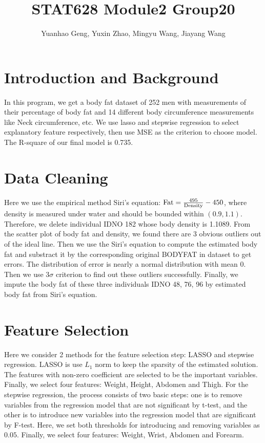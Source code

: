 \documentclass[12pt]{article}
\title{\vspace{-1.0cm}STAT628 Module2 Group20}
\author{Yuanhao Geng, Yuxin Zhao, Mingyu Wang, Jiayang Wang}
\date{}
\begin{document}
\maketitle
\vspace{-1.5cm}
\section{\vspace{-0.3cm}Introduction and Background}
In this program, we get a body fat dataset of 252 men with measurements of their percentage of body fat and 14 different body circumference measurements like Neck circumference, etc. We use lasso and stepwise regression to select explanatory feature respectively, then use MSE as the criterion to choose model. The R-square of our final model is 0.735.
\vspace{-0.6cm}
\section{\vspace{-0.3cm}Data Cleaning}

Here we use the empirical method Siri's equation: $\rm Fat=\frac{495}{Density} - 450$, where density is measured under water and should be bounded within $(0.9,1.1)$. Therefore, we delete individual IDNO 182 whose body density is 1.1089. From the scatter plot of body fat and density, we found there are 3 obvious outliers out of the ideal line. Then we use the Siri's equation to compute the estimated body fat and substract it by the corresponding original BODYFAT in dataset to get errors. The distribution of error is nearly a normal distribution with mean 0. Then we use $3\sigma$ criterion to find out these outliers successfully. Finally, we impute the body fat of these three individuals IDNO 48, 76, 96 by estimated body fat from Siri's equation.
\vspace{-0.6cm}
\section{\vspace{-0.3cm}Feature Selection}

Here we consider 2 methods for the feature selection step: LASSO and stepwise regression.
LASSO is use $L_1$ norm to keep the sparsity of the estimated solution. The features with non-zero coefficient are selected to be the important variables. Finally, we select four features: Weight, Height, Abdomen and Thigh.
For the stepwise regression, the process consists of two basic steps: one is to remove variables from the regression model that are not significant by t-test, and the other is to introduce new variables into the regression model that are significant by F-test. Here, we set both thresholds for introducing and removing variables as $0.05$. Finally, we select four features: Weight, Wrist, Abdomen and Forearm.
\vspace{-0.6cm}
\end{document}

